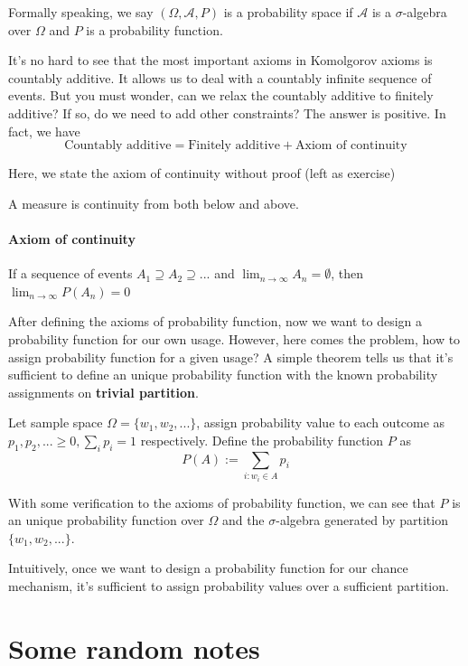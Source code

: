 \documentclass[Probability_Theory.tex]{subfiles}
\begin{document}
Formally speaking, we say $(\Omega,\mathcal{A},P)$ is a probability space if $\mathcal{A}$ is a $\sigma$-algebra over $\Omega$ and $P$ is a probability function.

It's no hard to see that the most important axioms in Komolgorov axioms is countably additive. It allows us to deal with a countably infinite sequence of events. But you must wonder, can we relax the countably additive to finitely additive? If so, do we need to add other constraints? The answer is positive. In fact, we have
$$\mbox{Countably additive} = \mbox{Finitely additive} + \mbox{Axiom of continuity}$$

Here, we state the axiom of continuity without proof (left as exercise)
\begin{remark}
A measure is continuity from both below and above.
\end{remark}
\paragraph{Axiom of continuity}
If a sequence of events $A_1\supseteq A_2\supseteq...$ and $\lim_{n\rightarrow\infty}A_n=\emptyset$, then $\lim_{n\rightarrow\infty}P(A_n)=0$

After defining the axioms of probability function, now we want to design a probability function for our own usage. However, here comes the problem, how to assign probability function for a given usage? A simple theorem tells us that it's sufficient to define an unique probability function with the known probability assignments on {\bf trivial partition}.
\begin{theorem}
	Let sample space $\Omega=\{w_1,w_2,...\}$, assign probability value to each outcome as $p_1,p_2,...\geq0, \sum_i p_i=1$ respectively. Define the probability function $P$ as
	$$P(A):=\sum_{i:w_i\in A}p_i$$
\end{theorem}
With some verification to the axioms of probability function, we can see that $P$ is an unique probability function over $\Omega$ and the $\sigma$-algebra generated by partition $\{w_1,w_2,...\}$.

Intuitively, once we want to design a probability function for our chance mechanism, it's sufficient to assign probability values over a sufficient partition.

\section{Some random notes}
\end{document}
